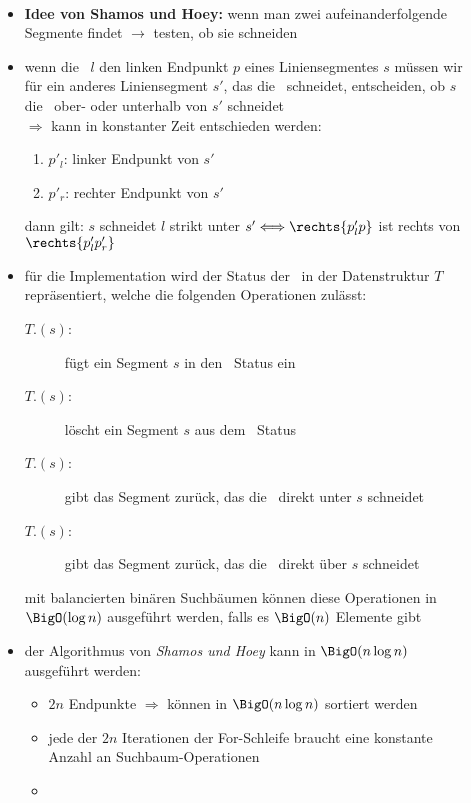 \begin{description}
	\item[]\ \\\up\up
		\begin{itemize}
			\item \textbf{Idee von Shamos und Hoey:} wenn man zwei aufeinanderfolgende Segmente findet $\rightarrow$ testen, ob sie schneiden
			\item wenn die \sweep~$l$ den linken Endpunkt $p$ eines Liniensegmentes $s$ müssen wir für ein anderes Liniensegment $s'$, das die \sweep~schneidet, entscheiden, ob $s$ die \sweep~ober- oder unterhalb von $s'$ schneidet\\
			$\Rightarrow$ kann in konstanter Zeit entschieden werden:
				\begin{enumerate}
					\item $p'_l$: linker Endpunkt von $s'$
					\item $p'_r$: rechter Endpunkt von $s'$
				\end{enumerate}
				dann gilt: $s$ schneidet $l$ strikt unter $s' \Longleftrightarrow \rechts{p'_lp}$ ist rechts von $\rechts{p'_lp'_r}$
			\item für die Implementation wird der Status der \sweep~in der Datenstruktur $T$ repräsentiert, welche die folgenden Operationen zulässt:
				\begin{description}
					\item[$T$.\insert$(s)$:] fügt ein Segment $s$ in den \sweep~Status ein
					\item[$T$.\delete$(s)$:] löscht ein Segment $s$ aus dem \sweep~Status
					\item[$T$.\pred$(s)$:] gibt das Segment zurück, das die \sweep~direkt unter $s$ schneidet
					\item[$T$.\succ$(s)$:] gibt das Segment zurück, das die \sweep~direkt über $s$ schneidet
				\end{description}
			mit balancierten binären Suchbäumen können diese Operationen in $\BigO(\log n)$ ausgeführt werden, falls es $\BigO(n)$ Elemente gibt
			\item der Algorithmus von \textit{Shamos und Hoey} kann in $\BigO(n\log n)$ ausgeführt werden:
				\begin{itemize}
					\item $2n$ Endpunkte $\Rightarrow$ können in $\BigO(n\log n)$ sortiert werden
					\item jede der $2n$ Iterationen der For-Schleife braucht eine konstante Anzahl an Suchbaum-Operationen
					\item {}

\end{itemize}
\end{itemize}
\end{description}
